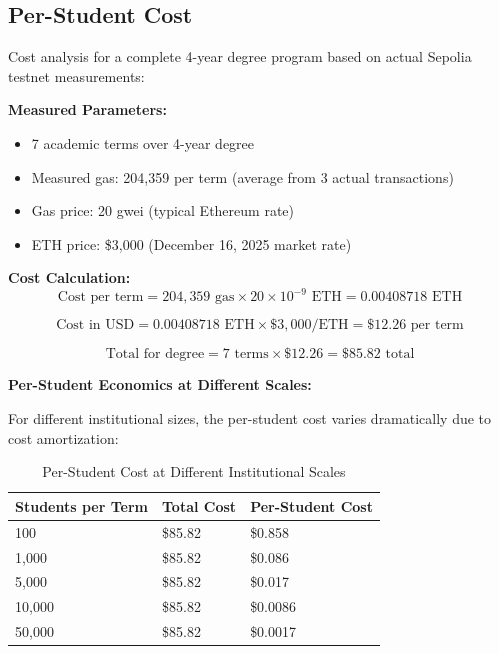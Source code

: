 \subsection{Per-Student Cost}
\label{subsec:per-student-cost}

Cost analysis for a complete 4-year degree program based on actual Sepolia testnet measurements:

\textbf{Measured Parameters:}
\begin{itemize}
    \item 7 academic terms over 4-year degree
    \item Measured gas: 204,359 per term (average from 3 actual transactions)
    \item Gas price: 20 gwei (typical Ethereum rate)
    \item ETH price: \$3,000 (December 16, 2025 market rate)
\end{itemize}

\textbf{Cost Calculation:}
\begin{equation}
\text{Cost per term} = 204,359 \text{ gas} \times 20 \times 10^{-9} \text{ ETH} = 0.00408718 \text{ ETH}
\end{equation}

\begin{equation}
\text{Cost in USD} = 0.00408718 \text{ ETH} \times \$3,000/\text{ETH} = \$12.26 \text{ per term}
\end{equation}

\begin{equation}
\text{Total for degree} = 7 \text{ terms} \times \$12.26 = \$85.82 \text{ total}
\end{equation}

\textbf{Per-Student Economics at Different Scales:}

For different institutional sizes, the per-student cost varies dramatically due to cost amortization:

\begin{table}[H]
\centering
\caption{Per-Student Cost at Different Institutional Scales}
\label{tab:per-student-cost-scale}
\begin{tabular}{|p{3.5cm}|p{3.5cm}|p{4.5cm}|}
\hline
\textbf{Students per Term} & \textbf{Total Cost} & \textbf{Per-Student Cost} \\
\hline
100 & \$85.82 & \$0.858 \\
\hline
1,000 & \$85.82 & \$0.086 \\
\hline
5,000 & \$85.82 & \$0.017 \\
\hline
10,000 & \$85.82 & \$0.0086 \\
\hline
50,000 & \$85.82 & \$0.0017 \\
\hline
\end{tabular}
\end{table}

